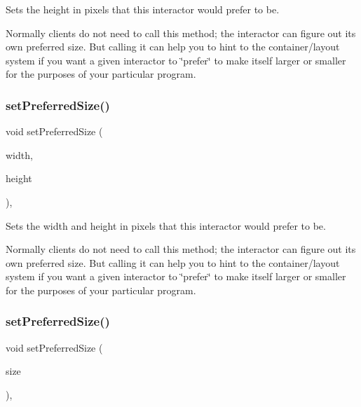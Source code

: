 Sets the height in pixels that this interactor would prefer to be. 

Normally clients do not need to call this method; the interactor can figure out its own preferred size. But calling it can help you to hint to the container/layout system if you want a given interactor to \char`\"{}prefer\char`\"{} to make itself larger or smaller for the purposes of your particular program. \mbox{\label{classsgl_1_1GInteractor_a042c5ae19430d765ef552371cae3632c}} 
\subsubsection{\texorpdfstring{set\+Preferred\+Size()}{setPreferredSize()}\hspace{0.1cm}{\footnotesize\ttfamily [1/2]}}
{\footnotesize\ttfamily void set\+Preferred\+Size (\begin{DoxyParamCaption}\item[{double}]{width,  }\item[{double}]{height }\end{DoxyParamCaption})\hspace{0.3cm}{\ttfamily [virtual]}, {\ttfamily [inherited]}}



Sets the width and height in pixels that this interactor would prefer to be. 

Normally clients do not need to call this method; the interactor can figure out its own preferred size. But calling it can help you to hint to the container/layout system if you want a given interactor to \char`\"{}prefer\char`\"{} to make itself larger or smaller for the purposes of your particular program. \mbox{\label{classsgl_1_1GInteractor_aa22d9be4bc0e078bb0ea69b0fc9d7c75}} 
\subsubsection{\texorpdfstring{set\+Preferred\+Size()}{setPreferredSize()}\hspace{0.1cm}{\footnotesize\ttfamily [2/2]}}
{\footnotesize\ttfamily void set\+Preferred\+Size (\begin{DoxyParamCaption}\item[{const \mbox{\hyperlink{structsgl_1_1GDimension}{G\+Dimension}} \&}]{size }\end{DoxyParamCaption})\hspace{0.3cm}{\ttfamily [virtual]}, {\ttfamily [inherited]}}



